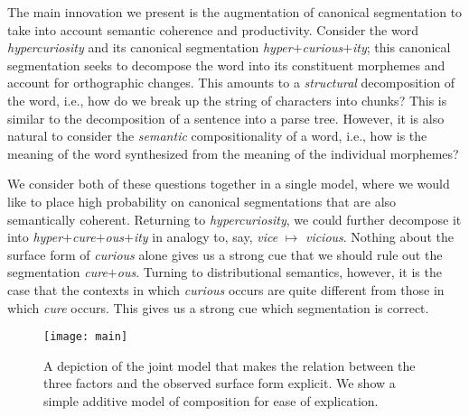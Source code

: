 \documentclass[11pt,letterpaper]{article}
\newcommand{\word}[1]{{\em #1}}
\begin{document}
The main innovation we present  is the augmentation of canonical segmentation
to take into account semantic coherence and productivity. Consider the  word  
\word{hypercuriosity}
and its canonical segmentation
\word{hyper}$+$\word{curious}$+$\word{ity}; this canonical segmentation
seeks to decompose the word into its constituent morphemes
and account for  orthographic changes. This amounts to a
{\em structural} decomposition of the word, i.e., how do we break up the
string of characters into chunks? This is similar to the decomposition of a
sentence into a parse tree. However, it is also natural to consider
the {\em semantic} compositionality of a word, i.e., how is the
meaning of the word synthesized from the meaning of the
individual morphemes?

We consider both of these questions together in a single model,
where we would like to place high probability
on canonical segmentations that are also semantically coherent.
Returning to
\word{hypercuriosity},
we could further decompose it into 
\word{hyper}$+$\word{cure}$+$\word{ous}$+$\word{ity}
in analogy to, say, \word{vice} $\mapsto$ \word{vicious}.
Nothing about the surface form of {\em curious} alone gives us a strong cue
that we should rule out the segmentation
\word{cure}$+$\word{ous}.
Turning to distributional semantics, however, it is the case that the
contexts in which \word{curious} occurs are quite different from those
in which \word{cure} occurs. This gives us a strong cue which
segmentation is correct.

%
%
%
%
%

\begin{figure}
  \texttt{[image: main]}
  \caption{A depiction of the joint model that makes the relation between
    the three factors and the observed surface form explicit. We show a simple additive
    model of composition for ease of explication.
  \label{fig:joint}}
\end{figure}
\end{document}
